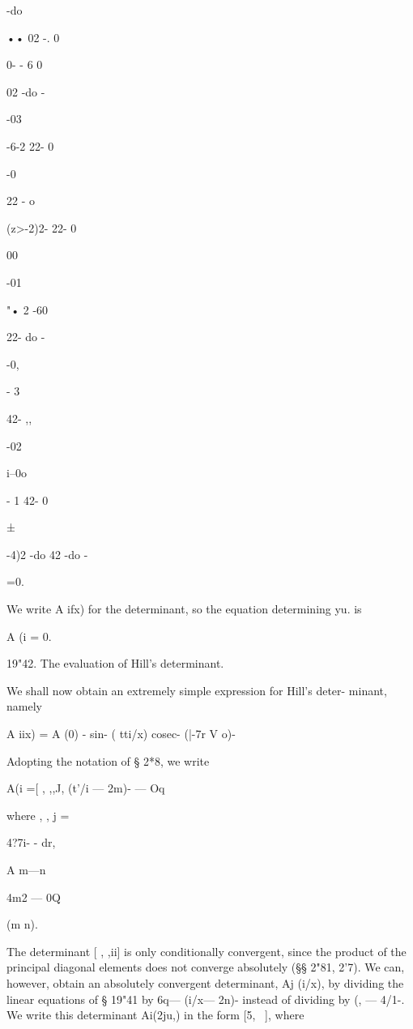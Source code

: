 -do 


 •• 02 -. 0 


0- - 6 0 


02 -do - 


-03 




-6-2 
22- 0 


-0  

22 - o 


(z>-2)2- 
22- 0 


00 


-01 


"• 2 -60 


22- do - 


-0, 




- 3 

42- ,, 


-02 

i--0o 


- 1 
42- 0 


 ± 


-4)2 -do 
42 -do - 



=0. 



We write A  ifx) for the determinant, so the equation determining yu. is 

A (i  = 0. 

19"42. The evaluation of Hill's determinant. 

We shall now obtain an extremely simple expression for Hill's deter- 
minant, namely 

A  iix) = A (0) - sin- ( tti/x) cosec- (|-7r V o)- 

Adopting the notation of § 2*8, we write 

A(i =[ , ,,J, 
(t'/i — 2m)- — Oq 



where  , , j = 



4?7i- - dr, 



A   m—n 

4m2 — 0Q 



(m   n). 



The determinant [ , ,ii] is only conditionally convergent, since the product 
of the principal diagonal elements does not converge absolutely (§§ 2"81, 2'7). 
We can, however, obtain an absolutely convergent determinant, Aj (i/x), by 
dividing the linear equations of § 19"41 by 6q— (i/x— 2n)- instead of dividing 
by  (, — 4/1-. We write this determinant Ai(2ju,) in the form [5, \  ], where 



